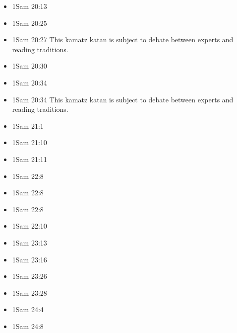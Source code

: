\documentclass[14pt]{book}
\begin{document}
\begin{multicols}{2}
\begin{itemize}
							\item 1Sam 20:13
							
							\item 1Sam 20:25
							
							\item 1Sam 20:27 This kamatz katan is subject to debate between experts and reading traditions.
							
							\item 1Sam 20:30
							
							\item 1Sam 20:34
							
							\item 1Sam 20:34 This kamatz katan is subject to debate between experts and reading traditions.
							
							\item 1Sam 21:1
							
							\item 1Sam 21:10
							
							\item 1Sam 21:11
							
							\item 1Sam 22:8
							
							\item 1Sam 22:8
							
							\item 1Sam 22:8
							
							\item 1Sam 22:10
							
							\item 1Sam 23:13
							
							\item 1Sam 23:16
							
							\item 1Sam 23:26
							
							\item 1Sam 23:28
							
							\item 1Sam 24:4
							
							\item 1Sam 24:8
							

\end{itemize}
\end{multicols}
\end{document}
